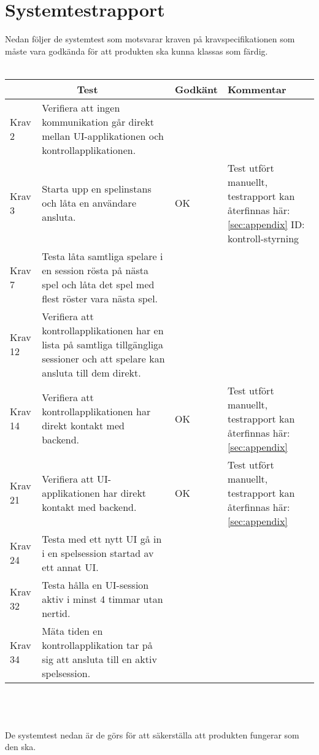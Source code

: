 \documentclass[10pt]{article}
\begin{document}
\section{Systemtestrapport}
Nedan följer de systemtest som motsvarar kraven på kravspecifikationen \cite{bib-kravspec} som måste vara godkända för att produkten ska kunna klassas som färdig.
\\ \\
\noindent
	\begin{tabular}{| p{1.5cm} | p{5cm} | p{1.2cm}| p{7cm}|}
  		\hline
    		\multicolumn{2}{|c|}{Test}&{Godkänt}&{Kommentar}\\
    		\hline
		Krav 2&Verifiera att ingen kommunikation går direkt mellan UI-applikationen och kontrollapplikationen.&&\\
		\hline
		Krav 3&Starta upp en spelinstans och låta en användare ansluta.&OK&Test utfört manuellt, testrapport kan återfinnas här: \ref{sec:appendix} ID: kontroll-styrning \\
		\hline
		Krav 7& Testa låta samtliga spelare i en session rösta på nästa spel och låta det spel med flest röster vara nästa spel.&&\\
		\hline
		Krav 12& Verifiera att kontrollapplikationen har en lista på samtliga tillgängliga sessioner och att spelare kan ansluta till dem direkt.&& \\
		\hline
		Krav 14& Verifiera att kontrollapplikationen har direkt kontakt med backend.&OK&Test utfört manuellt, testrapport kan återfinnas här: \ref{sec:appendix}\\
		\hline
		Krav 21& Verifiera att UI-applikationen har direkt kontakt med backend.&OK&Test utfört manuellt, testrapport kan återfinnas här: \ref{sec:appendix}\\
		\hline
		Krav 24&Testa med ett nytt UI gå in i en spelsession startad av ett annat UI.&& \\
		\hline
		Krav 32& Testa hålla en UI-session aktiv i minst 4 timmar utan nertid.&& \\
		\hline
		Krav 34& Mäta tiden en kontrollapplikation tar på sig att ansluta till en aktiv spelsession.&& \\
		\hline
  	\end{tabular}
\\ \\ \\
De systemtest nedan är de görs för att säkerställa att produkten fungerar som den ska.
\\ \\
\noindent
\end{document}
